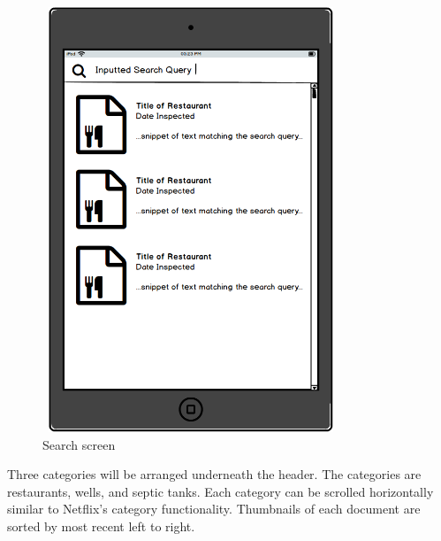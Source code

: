 \documentclass[twoside,letterpaper]{article}
\begin{document}
{\begin{figure}[h]
\centering
\includegraphics[width=3.5in,height=5in]{Search.png}
\caption{Search screen}
\end{figure}
\newpage
\noindent Three categories will be arranged underneath the header. The categories are restaurants, wells, and septic tanks. Each category can be scrolled horizontally similar to Netflix's category functionality. Thumbnails of each document are sorted by most recent left to right. 

}
\end{document}
